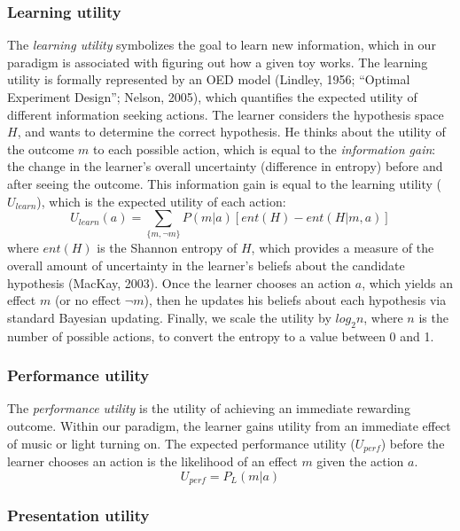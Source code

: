 \documentclass[10pt, letterpaper]{article}
\begin{document}
\subsubsection{Learning utility}\label{learning-utility}

The \emph{learning utility} symbolizes the goal to learn new
information, which in our paradigm is associated with figuring out how a
given toy works. The learning utility is formally represented by an OED
model (Lindley, 1956; ``Optimal Experiment Design''; Nelson, 2005),
which quantifies the expected utility of different information seeking
actions. The learner considers the hypothesis space \(H\), and wants to
determine the correct hypothesis. He thinks about the utility of the
outcome \(m\) to each possible action, which is equal to the
\emph{information gain}: the change in the learner's overall uncertainty
(difference in entropy) before and after seeing the outcome. This
information gain is equal to the learning utility (\(U_{learn}\)), which
is the expected utility of each action:
\[ U_{learn}(a) = \sum_{\{m, \neg m\}}{P(m|a)}[{ent(H) - ent(H|m,a)}]\]
\noindent
where \(ent(H)\) is the Shannon entropy of \(H\), which provides a
measure of the overall amount of uncertainty in the learner's beliefs
about the candidate hypothesis (MacKay, 2003). Once the learner chooses
an action \(a\), which yields an effect \(m\) (or no effect \(\neg m\)),
then he updates his beliefs about each hypothesis via standard Bayesian
updating. Finally, we scale the utility by \(log_2n\), where \(n\) is
the number of possible actions, to convert the entropy to a value
between 0 and 1.

\subsubsection{Performance utility}\label{performance-utility}

The \emph{performance utility} is the utility of achieving an immediate
rewarding outcome. Within our paradigm, the learner gains utility from
an immediate effect of music or light turning on. The expected
performance utility (\(U_{perf}\)) before the learner chooses an action
is the likelihood of an effect \(m\) given the action \(a\).
\[ U_{perf} = P_L(m | a) \] \noindent

\subsubsection{Presentation utility}\label{presentation-utility}
\end{document}
